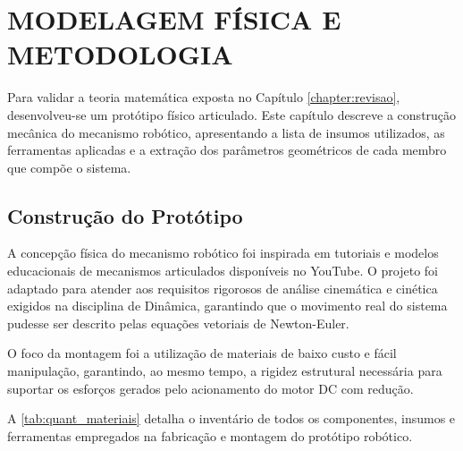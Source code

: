 \chapter{MODELAGEM FÍSICA E METODOLOGIA}
\label{chapter:metodologia}

Para validar a teoria matemática exposta no Capítulo \ref{chapter:revisao}, desenvolveu-se um protótipo físico articulado. Este capítulo descreve a construção mecânica do mecanismo robótico, apresentando a lista de insumos utilizados, as ferramentas aplicadas e a extração dos parâmetros geométricos de cada membro que compõe o sistema.

\section{Construção do Protótipo}
\label{sec:construcao}

A concepção física do mecanismo robótico foi inspirada em tutoriais e modelos educacionais de mecanismos articulados disponíveis no YouTube. O projeto foi adaptado para atender aos requisitos rigorosos de análise cinemática e cinética exigidos na disciplina de Dinâmica, garantindo que o movimento real do sistema pudesse ser descrito pelas equações vetoriais de Newton-Euler.

O foco da montagem foi a utilização de materiais de baixo custo e fácil manipulação, garantindo, ao mesmo tempo, a rigidez estrutural necessária para suportar os esforços gerados pelo acionamento do motor DC com redução.

A \ref{tab:quant_materiais} detalha o inventário de todos os componentes, insumos e ferramentas empregados na fabricação e montagem do protótipo robótico.

